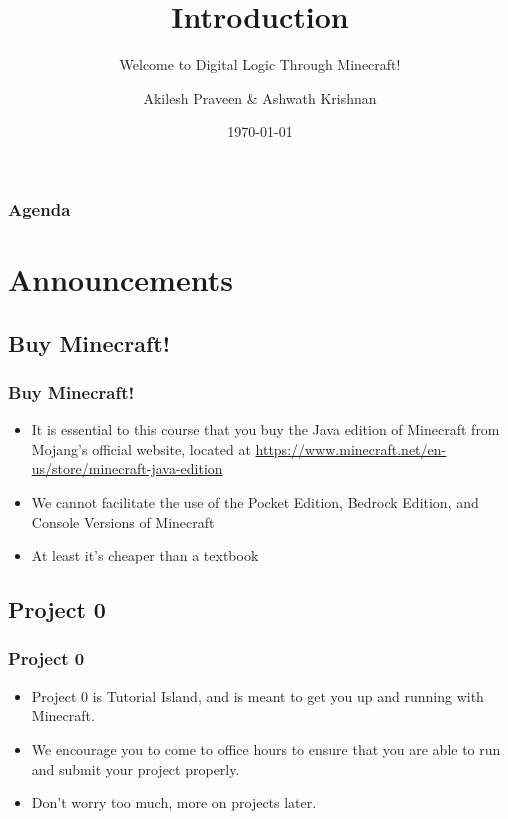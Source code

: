 \documentclass{beamer}
\title{Introduction}
\subtitle{Welcome to Digital Logic Through Minecraft!}
\author[A Praveen \& A Krishnan]{Akilesh Praveen \& Ashwath Krishnan}
\institute{UMD}
\date{\today}
\begin{document}
    \begin{frame}
        \titlepage
    \end{frame}
    
    \begin{frame}
        \frametitle{Agenda}
        \tableofcontents
    \end{frame}
    
    \section{Announcements}
        \subsection{Buy Minecraft!}
            
            \begin{frame}
                \frametitle{Buy Minecraft!}
                \begin{itemize}
                    \item It is essential to this course that you buy the Java edition of Minecraft from Mojang's official website, located at \href{https://www.minecraft.net/en-us/store/minecraft-java-edition//}{https://www.minecraft.net/en-us/store/minecraft-java-edition}
                    \item We cannot facilitate the use of the Pocket Edition, Bedrock Edition, and Console Versions of Minecraft
                    \item At least it's cheaper than a textbook
                \end{itemize}
            \end{frame}
        
            
        \subsection{Project 0}
            
            \begin{frame}
                \frametitle{Project 0}
                \begin{itemize}
                    \item Project 0 is Tutorial Island, and is meant to get you up and running with Minecraft.
                    \item We encourage you to come to office hours to ensure that you are able to run and submit your project properly.
                    \item Don't worry too much, more on projects later.
                \end{itemize}
            \end{frame}
            
\end{document}
